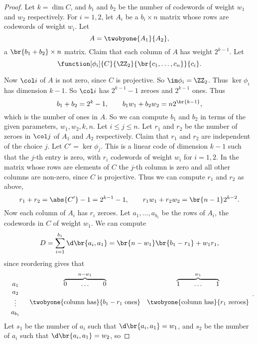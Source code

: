 \begin{proof}
Let $ k = \dim C $, and $ b_1 $ and $ b_2 $ be the number of codewords of weight $ w_1 $ and $ w_2 $ respectively. For $ i = 1, 2 $, let $ A_i $ be a $ b_i \times n $ matrix whose rows are codewords of weight $ w_i $. Let
$$ A = \twobyone{A_1}{A_2}, $$
a $ \br{b_1 + b_2} \times n $ matrix. Claim that each column of $ A $ has weight $ 2^{k - 1} $. Let
$$ \function[\phi_i]{C}{\ZZ_2}{\br{c_1, \dots, c_n}}{c_i}. $$

\pagebreak

Now $ \col i $ of $ A $ is not zero, since $ C $ is projective. So $ \im \phi_i = \ZZ_2 $. Thus $ \ker \phi_i $ has dimension $ k - 1 $. So $ \col i $ has $ 2^{k - 1} - 1 $ zeroes and $ 2^{k - 1} $ ones. Thus
$$ b_1 + b_2 = 2^k - 1, \qquad b_1w_1 + b_2w_2 = n2^{\br{k - 1}}, $$
which is the number of ones in $ A $. So we can compute $ b_1 $ and $ b_2 $ in terms of the given parameters, $ w_1, w_2, k, n $. Let $ i \le j \le n $. Let $ r_1 $ and $ r_2 $ be the number of zeroes in $ \col j $ of $ A_1 $ and $ A_2 $ respectively. Claim that $ r_1 $ and $ r_2 $ are independent of the choice $ j $. Let $ C' = \ker \phi_j $. This is a linear code of dimension $ k - 1 $ such that the $ j $-th entry is zero, with $ r_i $ codewords of weight $ w_i $ for $ i = 1, 2 $. In the matrix whose rows are elements of $ C $ the $ j $-th column is zero and all other columns are non-zero, since $ C $ is projective. Thus we can compute $ r_1 $ and $ r_2 $ as above,
$$ r_1 + r_2 = \abs{C'} - 1 = 2^{k - 1} - 1, \qquad r_1w_1 + r_2w_2 = \br{n - 1}2^{k - 2}. $$
Now each column of $ A_i $ has $ r_i $ zeroes. Let $ a_1, \dots, a_{b_1} $ be the rows of $ A_i $, the codewords in $ C $ of weight $ w_1 $. We can compute
$$ D = \sum_{i = 1}^{b_1} \d\br{a_i, a_1} = \br{n - w_1}\br{b_1 - r_1} + w_1r_1, $$
since reordering gives that
$$
\begin{array}{ccc}
a_1 & \overbrace{0 \qquad \dots \qquad 0}^{n - w_1} & \overbrace{1 \qquad \dots \qquad 1}^{w_1} \\
\begin{array}{c}
a_2 \\
\vdots \\
a_{b_1}
\end{array}
& \twobyone{\text{column has}}{b_1 - r_1 \ \text{ones}} & \twobyone{\text{column has}}{r_1 \ \text{zeroes}}
\end{array}.
$$
Let $ s_1 $ be the number of $ a_i $ such that $ \d\br{a_i, a_1} = w_1 $, and $ s_2 $ be the number of $ a_i $ such that $ \d\br{a_i, a_1} = w_2 $, so

\end{proof}
